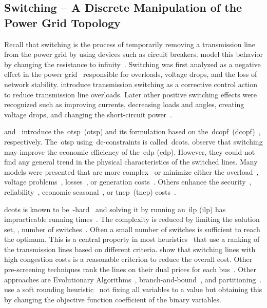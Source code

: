 \subsection{Switching -- A Discrete Manipulation of the Power Grid Topology}
\label{ch:related-work:sec:switching}
% 
Recall that switching is the process of temporarily removing a transmission line
from the power grid by using devices such as circuit breakers.
\citeauthor{Kir47} model this behavior by changing the resistance to
infinity~\parencite[p.501]{Kir47}.
% 
Switching was first analyzed as a negative effect in the power
grid~\parencite{GLAVITSCH198592} responsible for overloads, voltage drops, and
the loss of network stability.
%
\textcite{koglin1980overload} introduce transmission switching as a corrective
control action to reduce transmission line overloads. Later other positive
switching effects were recognized such as improving currents, decreasing loads
and angles, creating voltage drops, and changing the short-circuit
power~\parencite{GLAVITSCH198592,Hed11,744552}.

\textcite{1388507} and~\textcite{Fis08} introduce
the~\acrlong{otsp}~(\gls{otsp}) and its formulation based on
the~\acrlong{dcopf}~(\gls{dcopf})~\parencite{Cho06}, respectively.
The~\gls{otsp} using~\gls{dc}-constraints is called~\gls{dcots}.
\textcite{Fis08} observe that switching may improve the economic efficiency of
the~\acrlong{edp} (\gls{edp}). However, they could not find any general trend in
the physical characteristics of the switched lines.
%
Many models were presented that are more complex~\parencite{6646289,7285833} or
minimize either the
%
overload~\parencite{4334990,193839,486127},
% 
voltage problems~\parencite{4335192,ROLIM1995177},
% 
losses~\parencite{192895}, or 
% 
generation costs~\parencite{Fis08,ONeill2010}.
Others enhance the security~\parencite{Sch90,38969}, 
reliability~\parencite{6656013,7874194,7325581},
% 
economic seasonal~\parencite{6878486}, or 
% 
\acrlong{tnep}~(\gls{tnep}) costs~\parencite{5409537,VILLUMSEN2012377}.

\gls{dcots} is known to be~\NP-hard~\parencite{Leh14,Leh15a} 
% 
and solving it by running an~\acrlong{ilp} (\gls{ilp}) has impracticable running
times~\parencite{Fis08}. The complexity is reduced by limiting the solution set,
\ie, number of switches~\parencite{4558426,4957010,1525118}.
% 
Often a small number of switches is sufficient to reach the optimum. This is a
central property in most heuristics~\parencite{5463055,7038445,6164300} that use
a ranking of the transmission lines based on different criteria.
\textcite{7764208} show that switching lines with high congestion costs is a
reasonable criterion to reduce the overall cost. Other pre-screening techniques
rank the lines on their dual prices for each bus~\parencite{6191339}. Other
approaches are Evolutionary Algorithms~\parencite{916873,5352849},
branch-and-bound~\parencite{6955256}, and
partitioning~\parencite{7494647,LiG13,7038447}. \textcite{6938949} use a soft
rounding heuristic~\parencite[p.629]{Jue10aa} not fixing all variables to a
value but obtaining this by changing the objective function coefficient of the
binary variables.%

